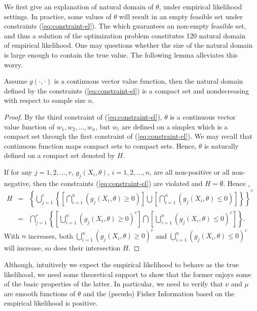 We first give an explanation of natural domain of $\theta$, under
empirical likelihood settings. In practice, some values of $\theta$
will result in an empty feasible set under constraints (\ref{eq:constraint-el}).
The which guarantees an non-empty feasible set, and thus a solution
of the optimization problem constitutes 120 natural domain of empirical
likelihood. One may questions whether the size of the natural domain
is large enough to contain the true value. The following lemma alleviates
this worry.
\begin{lem}
\label{lem:nondecreasing-compact-natural-domain}Assume $g\left(\cdot,\cdot\right)$
is a continuous vector value function, then the natural domain defined
by the constraints (\ref{eq:constraint-el}) is a compact set and
nondecreasing with respect to sample size $n$.\end{lem}
\begin{proof}
By the third constraint of (\ref{eq:constraint-el}), $\theta$ is
a continuous vector value function of $w_{1},w_{2},\ldots,w_{n}$,
but $w_{i}$ are defined on a simplex which is a compact set through
the first constraint of (\ref{eq:constraint-el}). We may recall that
continuous function maps compact sets to compact sets. Hence, $\theta$
is naturally defined on a compact set denoted by $H$.

If for any $j=1,2,\ldots,r$, $g_{j}\left(X_{i},\theta\right)$, $i=1,2,\ldots,n$,
are all non-positive or all non-negative, then the constraints (\ref{eq:constraint-el})
are violated and $H=\emptyset$. Hence ,
\begin{eqnarray*}
H & = & \left\{ \bigcup_{j=1}^{r}\left\{ \left[\bigcap_{i=1}^{n}\left(g_{j}\left(X_{i},\theta\right)\ge0\right)\right]\bigcup\left[\bigcap_{i=1}^{n}\left(g_{j}\left(X_{i},\theta\right)\le0\right)\right]\right\} \right\} ^{c}\\
 & = & \bigcap_{j=1}^{r}\left\{ \left[\bigcup_{i=1}^{n}\left(g_{j}\left(X_{i},\theta\right)\ge0\right)^{c}\right]\bigcap\left[\bigcup_{i=1}^{n}\left(g_{j}\left(X_{i},\theta\right)\le0\right)^{c}\right]\right\} .
\end{eqnarray*}
With $n$ increases, both $\bigcup_{i=1}^{n}\left(g_{j}\left(X_{i},\theta\right)\ge0\right)^{c}$
and $\bigcup_{i=1}^{n}\left(g_{j}\left(X_{i},\theta\right)\le0\right)^{c}$
will increase, so does their intersection $H$. 
\end{proof}
Although, intuitively we expect the empirical likelihood to behave
as the true likelihood, we need some theoretical support to show that
the former enjoys some of the basic properties of the latter. In particular,
we need to verify that $\nu$ and $\mu$ are smooth functions of $\theta$
and the (pseudo) Fisher Information based on the empirical likelihood
is positive. 

